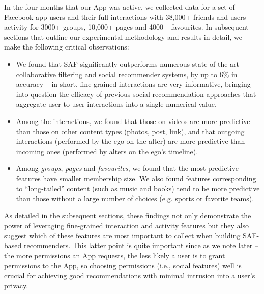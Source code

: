 In the four months that our App was active, we collected data for a set of 
Facebook app users and their full interactions with 38,000+ friends
and users activity for 3000+ groups, 10,000+ pages and 4000+ favourites. 
In subsequent sections that outline our experimental methodology and results in detail, 
we make the following critical observations:
\begin{itemize}
\item We found that SAF significantly 
outperforms numerous state-of-the-art collaborative filtering and social recommender 
systems, by up to 6\% in accuracy -- in short, fine-grained 
interactions are very informative, bringing into question the efficacy of 
previous social recommendation approaches that aggregate user-to-user interactions into 
a single numerical value.


\item Among the interactions, we found that those on videos are more predictive than those on other content types (photos, post, link), and that outgoing interactions (performed by the ego on the alter) 
are more predictive than incoming ones (performed by alters on the ego's timeline).
\item %
Among {\em groups}, {\em pages} and {\em favourites}, we found that the most  
predictive features have smaller membership size. We also found features
 corresponding to ``long-tailed'' content (such as music and books)
 tend to be more predictive than those without a large number of choices 
 (e.g. sports or favorite teams). 
\end{itemize}
As detailed in the subsequent sections, these findings not only
demonstrate the power of leveraging fine-grained interaction and
activity features but they also suggest which of these features are
most important to collect when building SAF-based recommenders.  This
latter point is quite important since as we note later -- the more
permissions an App requests, the less likely a user is to grant
permissions to the App, so choosing permissions (i.e., social
features) well is crucial for achieving good recommendations with
minimal intrusion into a user's privacy.


